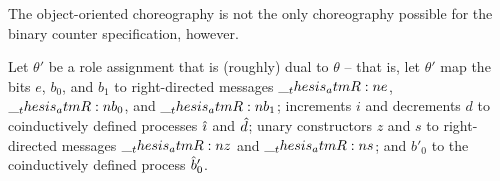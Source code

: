 The object-oriented choreography is not the only choreography possible for the binary counter specification, however.

Let $\theta'$ be%
a role assignment that is (roughly) dual to $\theta$ -- that is, let $\theta'$ map the bits $e$, $b_0$, and $b_1$ to right-directed messages $\__thesis_atmR:n {e}$, $\__thesis_atmR:n {b}_0$, and $\__thesis_atmR:n {b}_1$; increments $i$ and decrements $d$ to coinductively defined processes $\hat{\imath}$ and $\hat{d}$; unary constructors $z$ and $s$ to right-directed messages $\__thesis_atmR:n {z}$ and $\__thesis_atmR:n {s}$; and $b'_0$ to the coinductively defined process $\hat{b}'_0$.%

